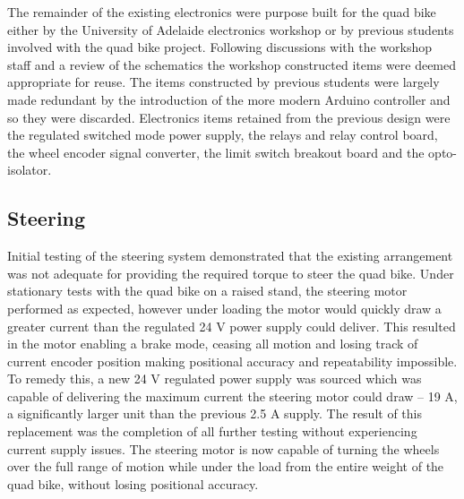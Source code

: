 \documentclass[main.tex]{subfiles}
\begin{document}
The remainder of the existing electronics were purpose built for the quad bike either by the University of Adelaide electronics workshop or by previous students involved with the quad bike project. Following discussions with the workshop staff and a review of the schematics the workshop constructed items were deemed appropriate for reuse. The items constructed by previous students were largely made redundant by the introduction of the more modern Arduino controller and so they were discarded. Electronics items retained from the previous design were the regulated switched mode power supply, the relays and relay control board, the wheel encoder signal converter, the limit switch breakout board and the opto-isolator. 


\subsection{Steering}
Initial testing of the steering system demonstrated that the existing arrangement was not adequate for providing the required torque to steer the quad bike. Under stationary tests with the quad bike on a raised stand, the steering motor performed as expected, however under loading the motor would quickly draw a greater current than the regulated 24 V power supply could deliver. This resulted in the motor enabling a brake mode, ceasing all motion and losing track of current encoder position making positional accuracy and repeatability impossible. To remedy this, a new 24 V regulated power supply was sourced which was capable of delivering the maximum current the steering motor could draw – 19 A, a significantly larger unit than the previous 2.5 A supply. The result of this replacement was the completion of all further testing without experiencing current supply issues. The steering motor is now capable of turning the wheels over the full range of motion while under the load from the entire weight of the quad bike, without losing positional accuracy.
\end{document}
